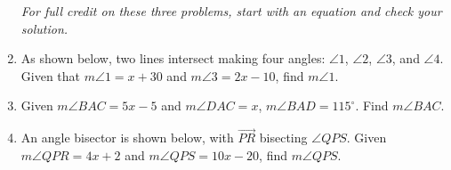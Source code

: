 \documentclass[12pt, twoside]{article}
\begin{document}
\begin{enumerate}
\newpage
\emph{For full credit on these three problems, start with an equation and check your solution.}
\item As shown below, two lines intersect making four angles: $\angle 1$, $\angle 2$, $\angle 3$, and $\angle 4$. Given that $m\angle 1= x+30$ and $m\angle 3=2x-10$, find $m\angle 1$.
  \begin{flushright}
    \end{flushright}

\item Given $m\angle BAC = 5x-5$ and $m\angle DAC = x$, $m\angle BAD=115^\circ$. Find $m\angle BAC$.
  \begin{flushright}
  \end{flushright} \vspace{1cm}

\item An angle bisector is shown below, with $\overrightarrow{PR}$ bisecting $\angle QPS$. Given $m\angle QPR = 4x+2$ and $m\angle QPS = 10x-20$, find $m\angle QPS$.
    \begin{flushright}
    \end{flushright}


\end{enumerate}
\end{document}
